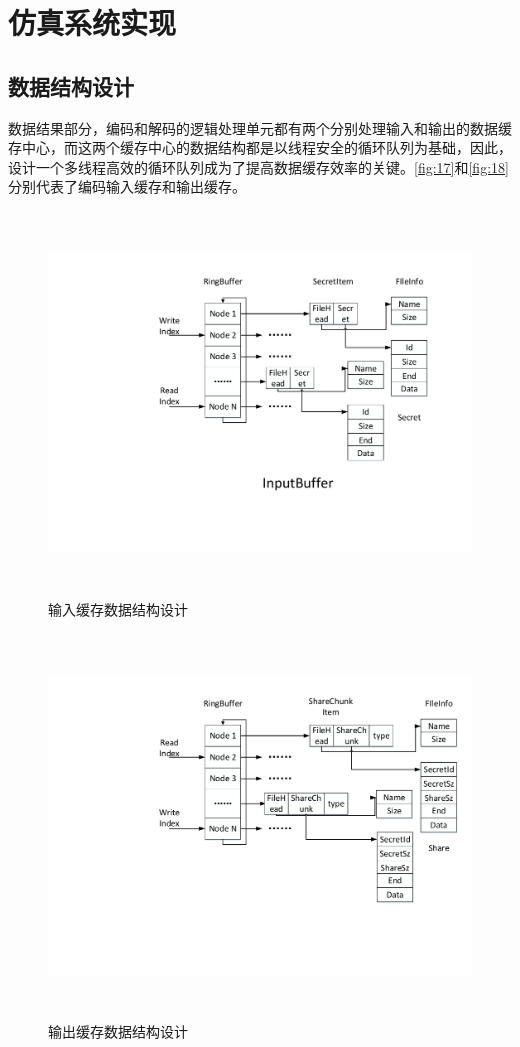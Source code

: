 \section{仿真系统实现}
\subsection{数据结构设计}
数据结果部分，编码和解码的逻辑处理单元都有两个分别处理输入和输出的数据缓存中心，而这两个缓存中心的数据结构都是以线程安全的循环队列为基础，因此，设计一个多线程高效的循环队列成为了提高数据缓存效率的关键。\autoref{fig:17}和\autoref{fig:18}分别代表了编码输入缓存和输出缓存。
\begin{figure}[H]
	\centering
	\includegraphics[width=1\textwidth,height=4in]{Pics/input-buf.pdf}
	\caption{输入缓存数据结构设计}
	\label{fig:17}
\end{figure}
\begin{figure}[H]
	\centering
	\includegraphics[width=1\textwidth,height=4in]{Pics/output-buf.pdf}
	\caption{输出缓存数据结构设计}
	\label{fig:18}
\end{figure}
